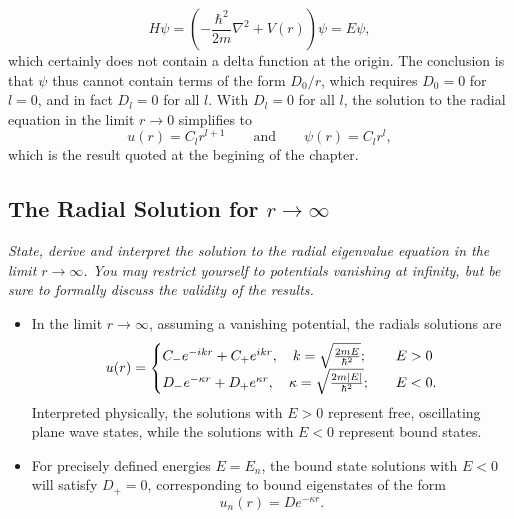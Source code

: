 \documentclass[11pt, a4paper]{article}
\renewcommand{\laplacian}{\nabla^{2}}
\newcommand{\eqtext}[1]{\qquad \text{#1} \qquad}
\newcommand{\p}{\psi}  %
\begin{document}
\begin{itemize}
    \begin{equation*}
        H \psi = \left( - \frac{\hbar^{2}}{2m}\laplacian + V(r) \right) \psi = E\psi,
    \end{equation*}
    which certainly does not contain a delta function at the origin. The conclusion is that $ \psi $ thus cannot contain terms of the form $ D_{0}/r $, which requires $ D_{0} = 0 $ for $ l = 0 $, and in fact $ D_{l} = 0 $ for all $ l $. With $ D_{l} = 0 $ for all $ l $, the solution to the radial equation in the limit $ r \to 0 $ simplifies to 
	\begin{equation*}
		u(r) = C_{l}r^{l+1} \eqtext{and} \p(r) = C_{l}r^{l},
	\end{equation*}
    which is the result quoted at the begining of the chapter.
	
\end{itemize}

\subsection{The Radial Solution for $ r \to \infty $}
\textit{State, derive and interpret the solution to the radial eigenvalue equation in the limit $ r \to \infty $. You may restrict yourself to potentials vanishing at infinity, but be sure to formally discuss the validity of the results.}


\begin{itemize}
    \item In the limit $ r \to \infty $, assuming a vanishing potential, the radials solutions are
    \begin{equation*}
        u(r) = 
        \begin{cases}
            C_{-}e^{-ikr} + C_{+}e^{ikr}, \quad k = \sqrt{\frac{2mE}{\hbar^{2}}}; & \quad E > 0\\
            D_{-}e^{-\kappa r} + D_{+}e^{\kappa r}, \quad \kappa = \sqrt{\frac{2m \abs{E}}{\hbar^{2}}}; & \quad E < 0.
        \end{cases}   
    \end{equation*}
    Interpreted physically, the solutions with $ E > 0 $ represent free, oscillating plane wave states, while the solutions with $ E < 0 $ represent bound states. 

    \item For precisely defined energies $ E = E_{n} $, the bound state solutions with $ E < 0 $ will satisfy $ D_{+} = 0 $, corresponding to bound eigenstates of the form
    \begin{equation*}
        u_{n}(r) = D e^{- \kappa r}.
    \end{equation*}
    
    
    
\end{itemize}
\end{document}
